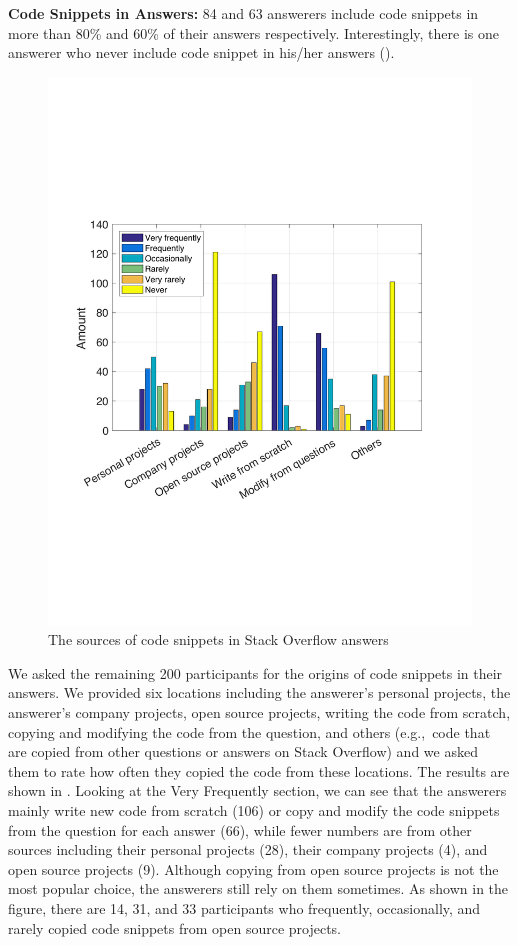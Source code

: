 \documentclass[10pt,journal,compsoc]{IEEEtran}
\begin{document}
\textbf{Code Snippets in Answers:}
84 and 63 answerers include code snippets in more than 80\% and 60\% of
their answers respectively. Interestingly, there is one answerer who never
include code snippet in his/her answers ().

\begin{figure}
	\centering
	\includegraphics[width=0.9\linewidth]{survey_snippet_source}
	\caption{The sources of code snippets in Stack Overflow answers}
	\label{fig:survey_snippet_source}
\end{figure}

We asked the remaining 200 participants for the origins of code snippets in
their answers. We provided six locations including the answerer's personal
projects, the answerer's company projects, open source projects, writing the
code from scratch, copying and modifying the code from the question, and others
(e.g.,\ code that are copied from other questions or answers on Stack Overflow)
and we asked them to rate how often they copied the code from these locations. The
results are shown in . Looking at the Very
Frequently section, we can see that the answerers mainly write new code from
scratch (106) or copy and modify the code snippets from the question for each answer (66),
while fewer numbers are from other sources including their personal projects
(28), their company projects (4), and open source projects (9). Although
copying from open source projects is not the most popular choice, the answerers
still rely on them sometimes. As shown in the figure, there are 14, 31, and 33
participants who frequently, occasionally, and rarely copied code snippets from
open source projects.
\end{document}
